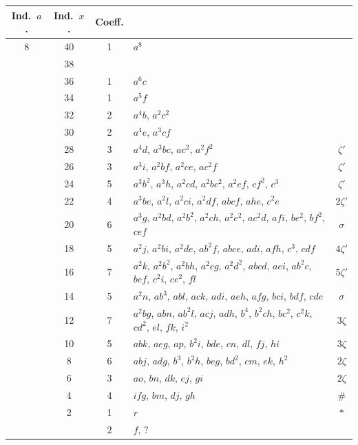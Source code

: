 \documentclass[11pt,a4paper]{article}
\begin{document}
\begin{center}
\begin{tabular}{ccc|l|c}
Ind.\ $a$. & Ind.\ $x$. & Coeff. & & \\\hline
8 & 40 & 1 & $a^{8}$ & \\
& 38 & & & \\
& 36 & 1 & $a^{6}c$ & \\
& 34 & 1 & $a^{5}f$ & \\
& 32 & 2 & $a^{4}b$, $a^{2}c^{2}$ & \\
& 30 & 2 & $a^{4}e$, $a^{3}cf$ & \\
& 28 & 3 & $a^{4}d$, $a^{3}bc$, $ac^{2}$, $a^{2}f^{2}$ & $\zeta'$\\
& 26 & 3 & $a^{3}i$, $a^{2}bf$, $a^{2}ce$, $ac^{2}f$ & $\zeta'$\\
& 24 & 5 & $a^{3}b^{2}$, $a^{3}h$, $a^{2}cd$, $a^{2}bc^{2}$, $a^{2}ef$, $cf^{2}$, $c^{3}$ & $\zeta'$\\
& 22 & 4 & $a^{3}be$, $a^{2}l$, $a^{2}ci$, $a^{2}df$, $abcf$, $ahe$, $c^{2}e$ & $2\zeta'$\\
& 20 & 6 & $a^{3}g$, $a^{2}bd$, $a^{2}b^{2}$, $a^{2}ch$, $a^{2}e^{2}$, $ac^{2}d$, $afi$, $be^{2}$, $bf^{2}$, $cef$ & $\sigma$\\
& 18 & 5 & $a^{2}j$, $a^{2}bi$, $a^{2}de$, $ab^{2}f$, $abce$, $adi$, $afh$, $c^{3}$, $cdf$ & $4\zeta'$\\
& 16 & 7 & $a^{2}k$, $a^{2}b^{2}$, $a^{2}bh$, $a^{2}cg$, $a^{2}d^{2}$, $abcd$, $aei$, $ab^{2}c$, $bef$, $c^{2}i$, $ce^{2}$, $fl$ & $5\zeta'$\\
& 14 & 5 & $a^{2}n$, $ab^{3}$, $abl$, $ack$, $adi$, $aeh$, $afg$, $bci$, $bdf$, $cde$ & $\sigma$\\
& 12 & 7 & $a^{2}bg$, $abn$, $ab^{2}l$, $acj$, $adh$, $b^{4}$, $b^{2}ch$, $bc^{2}$, $c^{2}k$, $cd^{2}$, $el$, $fk$, $i^{2}$ & $3\zeta$\\
& 10 & 5 & $abk$, $aeg$, $ap$, $b^{2}i$, $bde$, $cn$, $dl$, $fj$, $hi$ & $3\zeta$\\
& 8 & 6 & $abj$, $adg$, $b^{3}$, $b^{2}h$, $beg$, $bd^{2}$, $cm$, $ek$, $h^{2}$ & $2\zeta$\\
& 6 & 3 & $ao$, $bn$, $dk$, $ej$, $gi$ & $2\zeta$\\
& 4 & 4 & $ifg$, $bm$, $dj$, $gh$ & $\#$\\
& 2 & 1 & $r$ & $*$\\
& & 2 & $f$, $?$ &
\end{tabular}
\end{center}

\newpage
\setcounter{page}{346}
\end{document}
